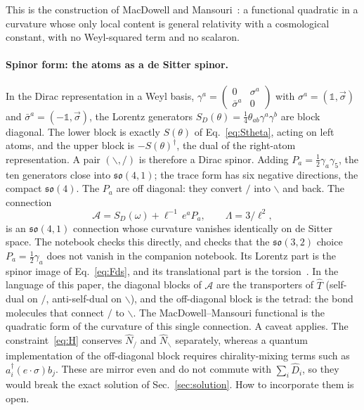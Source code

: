 \documentclass[reprint,aps,prd,amsmath,amssymb,superscriptaddress,nofootinbib,floatfix]{revtex4-2}
\theoremstyle{plain}
\theoremstyle{definition}
\theoremstyle{remark}
\newcommand{\Lat}{\ensuremath{/}}                 %
\newcommand{\Rat}{\ensuremath{\backslash}}        %
\newcommand{\Tc}{\hat{T}}
\newcommand{\one}{\mathbb{1}}
\begin{document}
This is the construction of MacDowell and Mansouri~\cite{MacDowellMansouri1977,Wise2010}: a functional
quadratic in a curvature whose only local content is general relativity with a cosmological constant, with
no Weyl-squared term and no scalaron.

\paragraph*{Spinor form: the atoms as a de Sitter spinor.} In the Dirac representation in a Weyl basis,
$\gamma^a=\left(\begin{smallmatrix}0&\sigma^a\\ \bar\sigma^a&0\end{smallmatrix}\right)$ with
$\sigma^a=(\one,\vec\sigma)$ and $\bar\sigma^a=(-\one,\vec\sigma)$, the Lorentz generators
$S_D(\theta)=\tfrac14\theta_{ab}\gamma^a\gamma^b$ are block diagonal. The lower block is exactly $S(\theta)$ of
Eq.~\eqref{eq:Stheta}, acting on left atoms, and the upper block is $-S(\theta)^\dagger$, the dual of the
right-atom representation. A pair $(\Rat,\Lat)$ is therefore a Dirac spinor. Adding $P_a=\tfrac12\gamma_a\gamma_5$,
the ten generators close into $\mathfrak{so}(4,1)$; the trace form has six negative directions, the compact
$\mathfrak{so}(4)$. The $P_a$ are off diagonal: they convert $\Lat$ into $\Rat$ and back. The connection
\begin{equation}
\mathcal{A}=S_D(\omega)+\ell^{-1}\,e^aP_a,\qquad \Lambda=3/\ell^2 ,
\label{eq:dSconnection}
\end{equation}
is an $\mathfrak{so}(4,1)$ connection whose curvature vanishes identically on de Sitter space. The notebook
checks this directly, and checks that the $\mathfrak{so}(3,2)$ choice $P_a=\tfrac12\gamma_a$ does not vanish
in the companion notebook. Its Lorentz part is the spinor image of Eq.~\eqref{eq:Fds}, and its translational part is the
torsion~\cite{Wise2010}. In the language of this paper, the diagonal blocks of $\mathcal{A}$ are the transporters of
$\Tc$ (self-dual on $\Lat$, anti-self-dual on $\Rat$), and the off-diagonal block is the tetrad: the bond
molecules that connect $\Lat$ to $\Rat$. The MacDowell--Mansouri functional is the quadratic form of the
curvature of this single connection. A caveat applies. The constraint~\eqref{eq:H} conserves
$\hat N_\Lat$ and $\hat N_\Rat$ separately, whereas a quantum implementation of the off-diagonal block requires
chirality-mixing terms such as $a_i^\dagger(e\cdot\sigma)b_j$. These are mirror even and do not commute with
$\sum_i\hat D_i$, so they would break the exact solution of Sec.~\ref{sec:solution}. How to incorporate them is
open.
\end{document}

